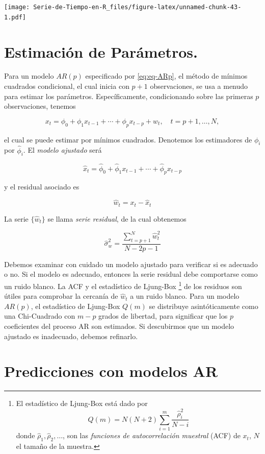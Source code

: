 \documentclass[12pt,]{krantz}
\theoremstyle{definition}
\theoremstyle{definition}
\theoremstyle{definition}
\theoremstyle{remark}
\begin{document}
\texttt{[image: Serie-de-Tiempo-en-R\_files/figure-latex/unnamed-chunk-43-1.pdf]}

\section{Estimación de Parámetros.}\label{estimacion-de-parametros.}

Para un modelo \(AR(p)\) especificado por \eqref{eq:eq-ARp}, el método de
mínimos cuadrados condicional, el cual inicia con \(p+1\) observaciones,
se usa a menudo para estimar los parámetros. Específicamente,
condicionando sobre las primeras \(p\) observaciones, tenemos

\[x_t=\phi_0+\phi_1x_{t-1}+\cdots+\phi_px_{t-p}+w_t,\quad t=p+1,\ldots,N,\]

el cual se puede estimar por mínimos cuadrados. Denotemos los
estimadores de \(\phi_i\) por \(\hat{\phi}_i\). El \emph{modelo
ajustado} será

\[\hat{x}_t = \hat{\phi}_0+\hat{\phi}_1x_{t-1}+\cdots+\hat{\phi}_px_{t-p}\]

y el residual asociado es

\[\hat{w}_t=x_t-\hat{x}_t\]

La serie \(\{\hat{w}_t\}\) se llama \emph{serie residual}, de la cual
obtenemos

\[\hat{\sigma}_w^2 = \frac{\sum_{t=p+1}^N\hat{w}_t^2}{N-2p-1}\]

Debemos examinar con cuidado un modelo ajustado para verificar si es
adecuado o no. Si el modelo es adecuado, entonces la serie residual debe
comportarse como un ruido blanco. La ACF y el estadístico de Ljung-Box
\footnote{El estadístico de Ljung-Box está dado por
  \[Q(m) = N(N+2)\sum_{i=1}^m\frac{\hat{\rho}_i^2}{N-i}\] donde
  \(\hat{\rho}_1,\hat{\rho}_2,\ldots\), son las \emph{funciones de
  autocorrelación muestral} (ACF) de \(x_t\), \(N\) el tamaño de la
  muestra.} de los residuos son útiles para comprobar la cercanía de
\(\hat{w}_t\) a un ruido blanco. Para un modelo \(AR(p)\), el
estadístico de Ljung-Box \(Q(m)\) se distribuye asintóticamente como una
Chi-Cuadrado con \(m-p\) grados de libertad, para significar que los
\(p\) coeficientes del proceso AR son estimados. Si descubirmos que un
modelo ajustado es inadecuado, debemos refinarlo.

\section{Predicciones con modelos AR}\label{predicciones-con-modelos-ar}
\end{document}
